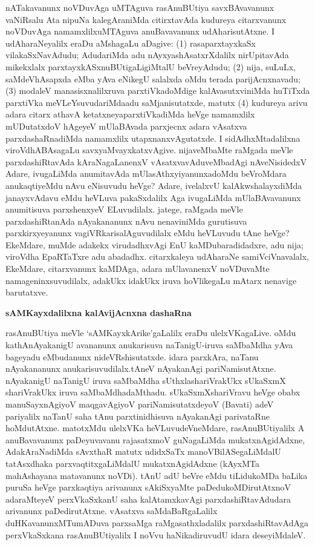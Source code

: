 nATakavanunx noVDuvAga uMTAguva rasAnuBUtiya savxBAvavanunx vaNiR\-salu Ata nipuNa kalegAraniMda citirxtavAda kudureya citarxvanunx noVDuvAga namamxlilx\break uMTAguva anuBavavanunx udAharisutAtxne. I udAharaNeyalilx eraDu aMsha\-gaLu aDagive: (1) rasaparxtayxkaSx vilakaSxNavAdudu; AdudariMda adu nAyxyashAsatxrXdalilx nirUpitavAda mikekxlalx parxtayxkASxnuBUtigaLigiMtalU beVreyAdudu; (2) nija, \hbox{suLuLx}, saMdeVhAsapxda eMba yAva eNikegU salalxda oMdu terada parijAcnxnavadu; (3) modaleV manasisxnalilxruva parxtiVkadoMdige kalAvasutxviniMda huTiTxda parxtiVka meVLeYsuvudariMda\break adu saMjanisutatxde, matutx (4) kudureya arivu adara citarx athavA ketatxneya\break parxtiVkadiMda heVge namamxlilx mUDutatxdoV hAgeyeV mUlaBAvada parxjecnx adara vAsatxva parxdashaRnadiMda namamxlilx utapxnanxvAgutatxde. I sidAdhxMtadalilxna viroVdhABAsagaLu savxyaM\break\-vayxkatxvAgive. nijaveMbaMte raMgada meVle parxdashiRtavAda kAraNagaLanenxV vAsatxvavAdu\break\-veMbadAgi nAveNisidedxV Adare, ivugaLiMda anumitavAda mUlasAthxyiyanunx\break adoMdu beVroMdara anukaqtiyeMdu nAvu eNisuvudu heVge? Adare, ive\-lalxvU kalAkwshalayxdiMda janayxvAdavu eMdu heVLuva pakaSxdalilx Aga ivugaLiMda mUla\-BAvavanunx anumitisuva parxshenxyeV ELuvudilalx. jatege, raMgada meVle parxdashiRtanAda nAyakananunx nAvu nenaviniMda gurutisuva parxkirxyeyanunx vagiVRkarisalAguvudilalx eMdu heVLuvudu tAne heVge? EkeMdare, muMde adakekx virudadhxvAgi EnU kaMDu\-baradidadxre, adu nija; viroVdha EpaRTaTxre adu abadadhx. citarxkaleya udAharaNe samiVciVnavalalx, EkeMdare, citarxvanunx kaMDAga, adara mUlavanenxV noVDuvaMte nama\-geninxsuvudilalx, adakUkx idakUkx iruva hoVlikegaLu mAtarx nenavige barutatxve.

\bigskip
\begin{center}
{\Large\bf sAMKayxdalilxna kalAvijAcnxna dashaRna}
\end{center}

rasAnuBUtiya meVle `sAMKayxkArike'gaLalilx eraDu ulelxVKagaLive. oMdu kathA\-nAyakanigU avananunx anukarisuva naTanigU-iruva saMbaMdha yAva bageyadu eMbudanunx nideVRshisutatxde. idara parxkAra, naTanu nAyakananunx anukarisuvu\-dilalx.\break tAneV nAyakanAgi pariNamisutAtxne. nAyakanigU naTanigU iruva saMbaMdha sUthxla\-shariVrakUkx sUkaSxmX shariVrakUkx iruva saMbaMdhadaMthadu. sUkaSxmXshariVravu heVge obabx manuSayxnAgiyoV maqgavAgiyoV pariNamisutatxdeyoV (Bavati) adeV pariyalilx naTanU saha tAnu parxtinidhisuva nAyakanAgi parivataRne hoMdutAtxne. matotxMdu ulelxVKa heVLuvudeVneMdare, rasAnuBUtiyalilx A anuBavavanunx paDeyuvavanu rajasatxmoV guNagaLiMda mukatxnAgidAdxne, AdakAraNadiMda sAvxthaR matutx udidxSaTx manoVBilASegaLiMdalU tatAsxdhaka parxvaqtitxgaLiMdalU mukatxnAgidAdxne (kAyxMTa mahAshayana matavanunx noVDi). tAnU adU beVre eMdu tiLidukoMDa baLika puruSa heVge parxkaqtiya arivanunx sAkiSxyaMte paDedukoMDirutAtxnoV adaraMteyeV perxVkaSxkanU saha kalAtamxkavAgi parxdashiRtavAdudara arivanunx paDedirutAtxne. vAsatxva saMdaBaRgaLalilx duHKavanunxMTumADuva parxsaMga raMgasathxladalilx parxdashiRtavAdAga perxVkaSxkana rasAnuBUtiyalilx I noVvu haNikadiruvudU idara deseyiMdaleV.

